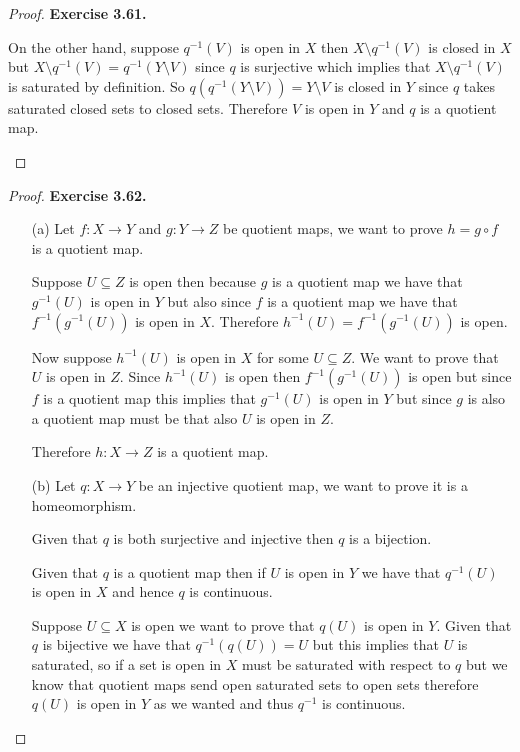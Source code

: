 \documentclass[11pt]{article}
\newcommand{\setmin}{\setminus}
\theoremstyle{definition}
\begin{document}
\begin{proof}{\textbf{Exercise 3.61.}}
\begin{itemize}
    On the other hand, suppose $q^{-1}(V)$ is open in $X$ then
    $X \setmin q^{-1}(V)$ is closed in $X$ but 
    $X \setmin q^{-1}(V) = q^{-1}(Y \setmin V)$ since $q$ is surjective
    which implies that $X \setmin q^{-1}(V)$ is saturated by definition.
    So $q(q^{-1}(Y \setmin V)) = Y\setmin V$ is closed in $Y$ since $q$
    takes saturated closed sets to closed sets. Therefore $V$ is open in $Y$
    and $q$ is a quotient map.
\end{itemize}
\end{proof}
\cleardoublepage
\begin{proof}{\textbf{Exercise 3.62.}}
\begin{itemize}
    \item [(a)]
    Let $f:X \to Y$ and $g:Y\to Z$ be quotient maps, we want to prove
    $h = g \circ f$ is a quotient map.

    Suppose $U \subseteq Z$ is open then because $g$ is a quotient map
    we have that $g^{-1}(U)$ is open in $Y$ but also since $f$ is a quotient
    map we have that $f^{-1}(g^{-1}(U))$ is open in $X$.
    Therefore $h^{-1}(U) = f^{-1}(g^{-1}(U))$ is open.

    Now suppose $h^{-1}(U)$ is open in $X$ for some $U \subseteq Z$. We want
    to prove that $U$ is open in $Z$. Since $h^{-1}(U)$ is open then
    $f^{-1}(g^{-1}(U))$ is open but since $f$ is a quotient map this implies
    that $g^{-1}(U)$ is open in $Y$ but since $g$ is also a quotient map
    must be that also $U$ is open in $Z$.

    Therefore $h: X \to Z$ is a quotient map.

    \item [(b)]
    Let $q: X \to Y$ be an injective quotient map, we want to prove it is a
    homeomorphism.

    Given that $q$ is both surjective and injective then $q$ is a bijection.

    Given that $q$ is a quotient map then if $U$ is open in $Y$ we have that
    $q^{-1}(U)$ is open in $X$ and hence $q$ is continuous.

    Suppose $U \subseteq X$ is open we want to prove that $q(U)$ is open in $Y$.
    Given that $q$ is bijective we have that
    $q^{-1}(q(U)) = U$ but this implies that $U$ is saturated, so if a set
    is open in $X$ must be saturated with respect to $q$ but we know that 
    quotient maps send open saturated sets to open sets therefore $q(U)$ 
    is open in $Y$ as we wanted and thus $q^{-1}$ is continuous.


\end{itemize}
\end{proof}
\end{document}
